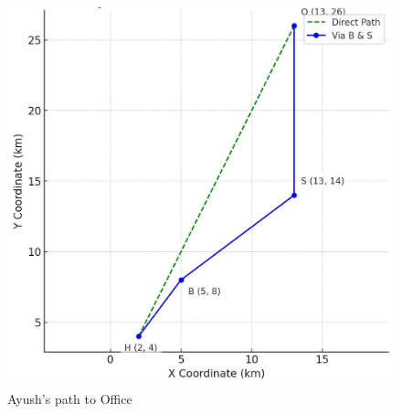 \begin{figure}[H]
\centering
\includegraphics[width=0.7\columnwidth]{figs/graph.png}
 \caption*{Ayush's path to Office}
\label{fig:graph.png}
\end{figure}